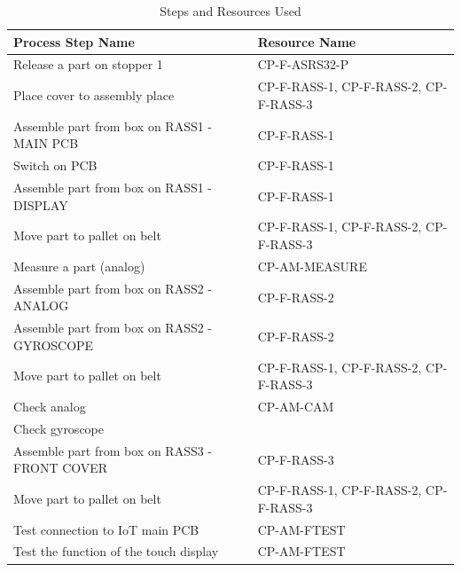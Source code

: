 \begin{table}[H]
    \centering
    \footnotesize
    \caption[Production Steps and Resources]{Steps and Resources Used}
    \label{tab:description-resources}
    \begin{tabular}{@{}p{}p{}@{}}
        \toprule
        \textbf{Process Step Name}                    & \textbf{Resource Name}                \\
        \midrule
        Release a part on stopper 1                   & CP-F-ASRS32-P                         \\
        Place cover to assembly place                 & CP-F-RASS-1, CP-F-RASS-2, CP-F-RASS-3 \\
        Assemble part from box on RASS1 - MAIN PCB    & CP-F-RASS-1                           \\
        Switch on PCB                                 & CP-F-RASS-1                           \\
        Assemble part from box on RASS1 - DISPLAY     & CP-F-RASS-1                           \\
        Move part to pallet on belt                   & CP-F-RASS-1, CP-F-RASS-2, CP-F-RASS-3 \\
        Measure a part (analog)                       & CP-AM-MEASURE                         \\
        Assemble part from box on RASS2 - ANALOG      & CP-F-RASS-2                           \\
        Assemble part from box on RASS2 - GYROSCOPE   & CP-F-RASS-2                           \\
        Move part to pallet on belt                   & CP-F-RASS-1, CP-F-RASS-2, CP-F-RASS-3 \\
        Check analog                                  & CP-AM-CAM                             \\
        Check gyroscope                               &                                       \\
        Assemble part from box on RASS3 - FRONT COVER & CP-F-RASS-3                           \\
        Move part to pallet on belt                   & CP-F-RASS-1, CP-F-RASS-2, CP-F-RASS-3 \\
        Test connection to IoT main PCB               & CP-AM-FTEST                           \\
        Test the function of the touch display        & CP-AM-FTEST                           \\

\end{tabular}
\end{table}
